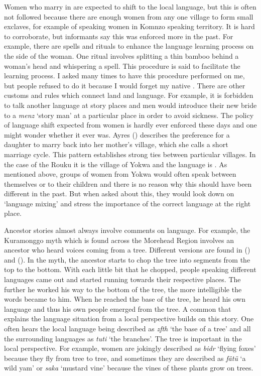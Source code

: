 Women who marry in are expected to shift to the local language, but this is often not followed because there are enough women from any one village to form small exclaves, for example of  speaking women in Komnzo speaking territory. It is hard to corroborate, but informants say this was enforced more in the past. For example, there are spells and rituals to enhance the language learning process on the side of the woman. One ritual involves splitting a thin bamboo behind a woman's head and whispering a spell. This procedure is said to facilitate the learning process. I asked many times to have this procedure performed on me, but people refused to do it because I would forget my native . There are other customs and rules which connect land and language. For example, it is forbidden to talk another language at story places and men would introduce their new bride to a \textit{menz} `story man' at a particular place in order to avoid sickness. The policy of language shift expected from women is hardly ever enforced these days and one might wonder whether it ever was. Ayres (\citeyear[226]{Ayres:ws}) describes the preference for a daughter to marry back into her mother's village, which she calls a short marriage cycle. This pattern establishes strong ties between particular villages. In the case of the Rouku it is the village of Yokwa and the language is . As mentioned above, groups of women from Yokwa would often speak  between themselves or to their children and there is no reason why this should have been different in the past. But when asked about this, they would look down on `language mixing' and stress the importance of the correct language at the right place.%

Ancestor stories almost always involve comments on language. For example, the Kuramonggo myth which is found across the Morehead Region involves an ancestor who heard voices coming from a tree. Different versions are found in (\citealt[299]{Williams:1936transfly}) and (\citealt[102]{Ayres:ws}). In the myth, the ancestor starts to chop the tree into segments from the top to the bottom. With each little bit that he chopped, people speaking different languages came out and started running towards their respective places. The further he worked his way to the bottom of the tree, the more intelligible the words became to him. When he reached the base of the tree, he heard his own language and thus his own people emerged from the tree. A common  that explains the language situation from a local perspective builds on this story. One often hears the local language being described as \emph{zfth} `the base of a tree' and all the surrounding languages as \emph{tuti} `the branches'. The tree  is important in the local perspective. For example, women are jokingly described as \textit{bidr} `flying foxes' because they fly from tree to tree, and sometimes they are described as \textit{fätü} `a wild yam' or \textit{saka} `mustard vine' because the vines of these plants grow on trees.

